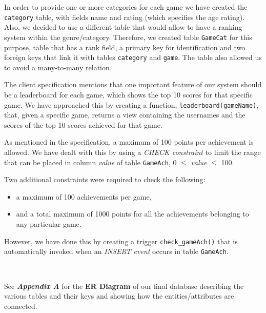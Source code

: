 \documentclass{article}
\begin{document}
\par{In order to provide one or more categories for each game we have created the \texttt{category} table, with fields name and rating (which specifies the age rating). Also, we decided to use a different table that would allow to have a ranking system within the genre/category. Therefore, we created table \texttt{GameCat} for this purpose, table that has a rank field, a primary key for identification and two foreign keys that link it with tables \texttt{category} and \texttt{game}. The table also allowed us to avoid a many-to-many relation.}\\

\par {The client specification mentions that one important feature of our system should be a leaderboard for each game, which shows the top 10 scores for that specific game. We have approached this by creating a function, \texttt{leaderboard(gameName)}, that, given a specific game, returns a view containing the usernames and the scores of the top 10 scores achieved for that game.}\\

\par {As mentioned in the specification, a maximum of 100 points per achievement is allowed. We have dealt with this by using a \emph{CHECK constraint} to limit the range that can be placed in column \emph{value} of table \texttt{GameAch}, 0 $\leq$ \emph{value} $\leq$ 100.}\\

\par {Two additional constraints were required to check the following:
\begin{itemize}[noitemsep, nolistsep]
  \item a maximum of 100 achievements per game,
  \item and a total maximum of 1000 points for all the achievements belonging to any particular game.
\end{itemize}
However, we have done this by creating a trigger \texttt{check\_gameAch()} that is automatically invoked when an \emph{INSERT event} occurs in table \texttt{GameAch}.}\\

\par {See \emph{\textbf{Appendix A}} for the \textbf{ER Diagram} of our final database describing the various tables and their keys and showing how the entities/attributes are connected.}\\
\end{document}
